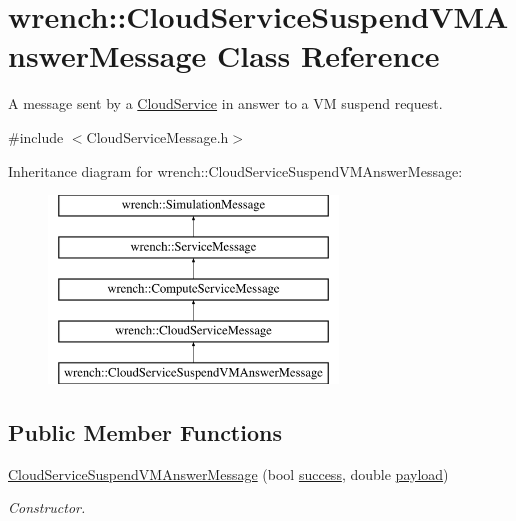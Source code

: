 \hypertarget{classwrench_1_1_cloud_service_suspend_v_m_answer_message}{}\section{wrench\+:\+:Cloud\+Service\+Suspend\+V\+M\+Answer\+Message Class Reference}
\label{classwrench_1_1_cloud_service_suspend_v_m_answer_message}


A message sent by a \hyperlink{classwrench_1_1_cloud_service}{Cloud\+Service} in answer to a VM suspend request.  




{\ttfamily \#include $<$Cloud\+Service\+Message.\+h$>$}

Inheritance diagram for wrench\+:\+:Cloud\+Service\+Suspend\+V\+M\+Answer\+Message\+:\begin{figure}[H]
\begin{center}
\leavevmode
\includegraphics[height=5.000000cm]{classwrench_1_1_cloud_service_suspend_v_m_answer_message}
\end{center}
\end{figure}
\subsection*{Public Member Functions}
\begin{DoxyCompactItemize}
\item 
\hyperlink{classwrench_1_1_cloud_service_suspend_v_m_answer_message_ae0de72d0470fad3a7a51432a3b3ad141}{Cloud\+Service\+Suspend\+V\+M\+Answer\+Message} (bool \hyperlink{classwrench_1_1_cloud_service_suspend_v_m_answer_message_a68371e3f2be2d713de425e0c2d8c5a93}{success}, double \hyperlink{classwrench_1_1_simulation_message_a914f2732713f7c02898e66f05a7cb8a1}{payload})
\begin{DoxyCompactList}\small\item\em Constructor. \end{DoxyCompactList}\end{DoxyCompactItemize}
